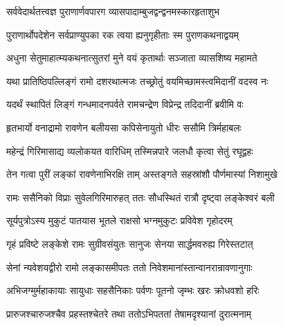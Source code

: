 
\vakta{}
\shrota{}
\tags{}

\storymeta





\twolineshloka
{सर्ववेदार्थतत्त्वज्ञ पुराणार्णवपारग}
{व्यासपादाम्बुजद्वन्द्वनमस्कारहृताशुभ}%

\twolineshloka
{पुराणार्थोपदेशेन सर्वप्राण्युपका रक}
{त्वया ह्यनुगृहीताः स्म पुराणकथनाद्वयम्}%

\twolineshloka
{अधुना सेतुमाहात्म्यकथनात्सुतरां मुने}
{वयं कृतार्थाः सञ्जाता व्यासशिष्य महामते}%

\twolineshloka
{यथा प्रातिष्ठिपल्लिङ्गं रामो दशरथात्मजः}
{तच्छ्रोतुं वयमिच्छामस्त्वमिदानीं वदस्व नः}%


\twolineshloka
{यदर्थं स्थापितं लिङ्गं गन्धमादनपर्वते}
{रामचन्द्रेण विप्रेन्द्र तदिदानीं ब्रवीमि वः}%

\twolineshloka
{हृतभार्यो वनाद्रामो रावणेन बलीयसा}
{कपिसेनायुतो धीरः ससौमि त्रिर्महाबलः}%

\twolineshloka
{महेन्द्रं गिरिमासाद्य व्यलोकयत वारिधिम्}
{तस्मिन्नपारे जलधौ कृत्वा सेतुं रघूद्वहः}%

\twolineshloka
{तेन गत्वा पुरीं लङ्कां रावणेनाभिरक्षि ताम्}
{अस्तङ्गते सहस्रांशौ पौर्णमास्यां निशामुखे}%

\twolineshloka
{रामः ससैनिको विप्राः सुवेलगिरिमारुहत्}
{ततः सौधस्थितं रात्रौ दृष्ट्वा लङ्केश्वरं बली}%

\twolineshloka
{सूर्यपुत्रोऽस्य मुकुटं पातयास भूतले}
{राक्षसो भग्नमुकुटः प्रविवेश गृहोदरम्}%

\twolineshloka
{गृहं प्रविष्टे लङ्केशे रामः सुग्रीवसंयुतः}
{सानुजः सेनया सार्द्धमवरुह्य गिरेस्तटात्}%

\twolineshloka
{सेनां न्यवेशयद्वीरो रामो लङ्कासमीपतः}
{ततो निवेशमानांस्तान्वानरान्रावणानुगाः}%

\twolineshloka
{अभिजग्मुर्महाकायाः सायुधाः सहसैनिकाः}
{पर्वणः पूतनो जृम्भः खरः क्रोधवशो हरिः}%

\twolineshloka
{प्रारुजश्चारुजश्चैव प्रहस्तश्चेतरे तथा}
{ततोऽभिपततां तेषामदृश्यानां दुरात्मनाम्}%

